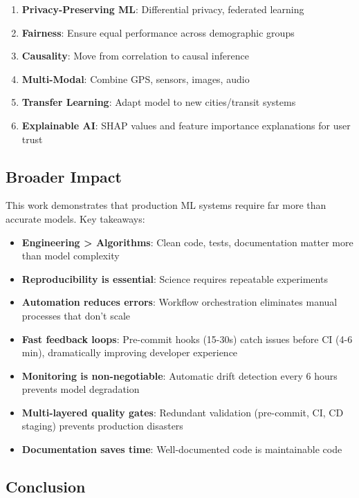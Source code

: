 \begin{enumerate}
    \item \textbf{Privacy-Preserving ML}: Differential privacy, federated learning
    \item \textbf{Fairness}: Ensure equal performance across demographic groups
    \item \textbf{Causality}: Move from correlation to causal inference
    \item \textbf{Multi-Modal}: Combine GPS, sensors, images, audio
    \item \textbf{Transfer Learning}: Adapt model to new cities/transit systems
    \item \textbf{Explainable AI}: SHAP values and feature importance explanations for user trust
\end{enumerate}

\subsection{Broader Impact}

This work demonstrates that production ML systems require far more than accurate models. Key takeaways:

\begin{itemize}
    \item \textbf{Engineering > Algorithms}: Clean code, tests, documentation matter more than model complexity
    \item \textbf{Reproducibility is essential}: Science requires repeatable experiments
    \item \textbf{Automation reduces errors}: Workflow orchestration eliminates manual processes that don't scale
    \item \textbf{Fast feedback loops}: Pre-commit hooks (15-30s) catch issues before CI (4-6 min), dramatically improving developer experience
    \item \textbf{Monitoring is non-negotiable}: Automatic drift detection every 6 hours prevents model degradation
    \item \textbf{Multi-layered quality gates}: Redundant validation (pre-commit, CI, CD staging) prevents production disasters
    \item \textbf{Documentation saves time}: Well-documented code is maintainable code
\end{itemize}

\subsection{Conclusion}

